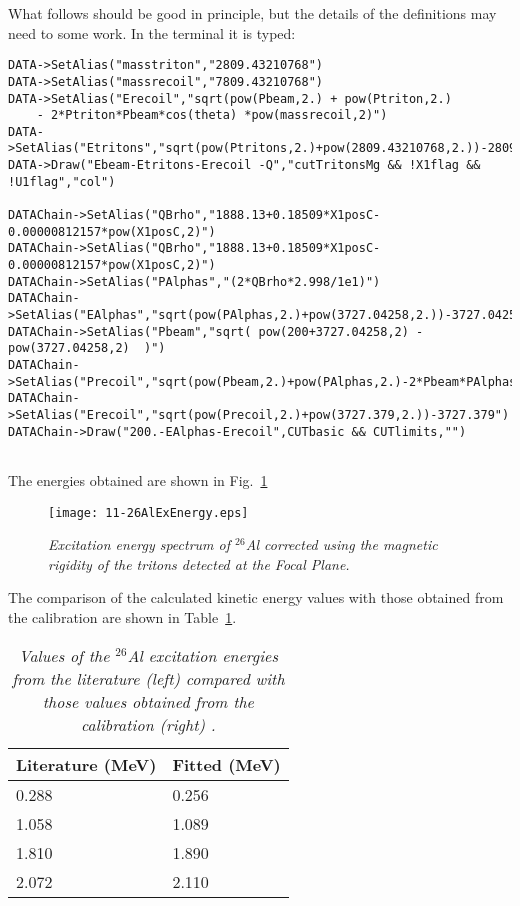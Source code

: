 \documentclass[11pt]{report}
\begin{document}
\noindent
{\color{red} What follows should be good in principle, but the details of the definitions may need to some work.}
In the terminal it is typed:
\begin{verbatim}
DATA->SetAlias("masstriton","2809.43210768")
DATA->SetAlias("massrecoil","7809.43210768")
DATA->SetAlias("Erecoil","sqrt(pow(Pbeam,2.) + pow(Ptriton,2.) 
	- 2*Ptriton*Pbeam*cos(theta) *pow(massrecoil,2)")
DATA->SetAlias("Etritons","sqrt(pow(Ptritons,2.)+pow(2809.43210768,2.))-2809.43210768")
DATA->Draw("Ebeam-Etritons-Erecoil -Q","cutTritonsMg && !X1flag && !U1flag","col")

DATAChain->SetAlias("QBrho","1888.13+0.18509*X1posC-0.00000812157*pow(X1posC,2)")
DATAChain->SetAlias("QBrho","1888.13+0.18509*X1posC-0.00000812157*pow(X1posC,2)")
DATAChain->SetAlias("PAlphas","(2*QBrho*2.998/1e1)")
DATAChain->SetAlias("EAlphas","sqrt(pow(PAlphas,2.)+pow(3727.04258,2.))-3727.04258")
DATAChain->SetAlias("Pbeam","sqrt( pow(200+3727.04258,2) -pow(3727.04258,2)  )")
DATAChain->SetAlias("Precoil","sqrt(pow(Pbeam,2.)+pow(PAlphas,2.)-2*Pbeam*PAlphas*cos(thetaSCAT*3.1415/180.))")
DATAChain->SetAlias("Erecoil","sqrt(pow(Precoil,2.)+pow(3727.379,2.))-3727.379")
DATAChain->Draw("200.-EAlphas-Erecoil",CUTbasic && CUTlimits,"")


\end{verbatim}

\noindent
The energies obtained are shown in Fig.~\ref{fig:26AlExEnergy}

\begin{figure}[h]
 \begin{center}
\texttt{[image: 11-26AlExEnergy.eps]}  
 \end{center}
\vspace*{-4mm}
\caption{\label{fig:26AlExEnergy} \it Excitation energy spectrum of $^{26}$Al corrected using the magnetic rigidity of the tritons detected at the Focal Plane.}
\end{figure}
\vspace*{4mm}

\noindent
The comparison of the calculated kinetic energy values with those obtained from the calibration are shown in Table~\ref{tab:Ttvalues}.

\begin{table}[!th]
\centering
\begin{tabular}{|l|l|}
\hline
Literature (MeV)&Fitted (MeV)\\
\hline
0.288&0.256\\
1.058&1.089\\
1.810&1.890\\
2.072&2.110\\
\hline
\end{tabular}
\caption{\it Values of the $^{26}$Al excitation energies from the literature (left) compared with those values obtained from the calibration (right) \cite{nndc}.}
\label{tab:Ttvalues}
\end{table}
\end{document}
